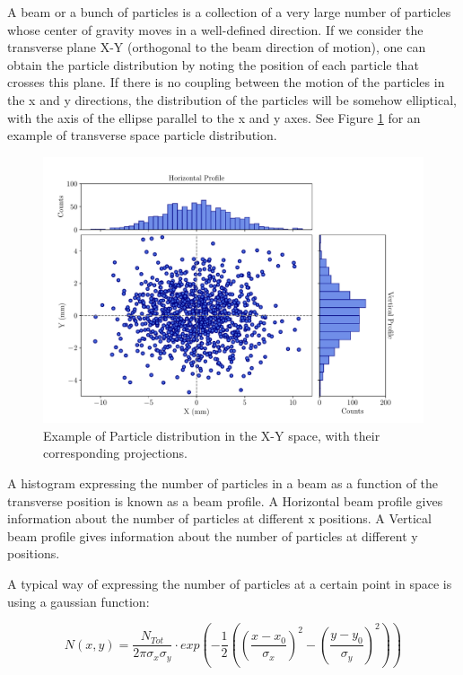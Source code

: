 A beam or a bunch of particles is a collection of a very large number of particles whose center of gravity moves in a well-defined direction. If we consider the transverse plane X-Y (orthogonal to the beam direction of motion), one can obtain the particle distribution by noting the position of each particle that crosses this plane. If there is no coupling between the motion of the particles in the x and y directions, the distribution of the particles will be somehow elliptical, with the axis of the ellipse parallel to the x and y axes. See Figure \ref{fig:TransversePlane} for an example of transverse space particle distribution. 

\begin{figure}[h]
    \centering
    \includegraphics[width=0.9\columnwidth]{Figure_ParticlePositionExample/ParticlePosition.pdf}
    \caption{Example of Particle distribution in the X-Y space, with their corresponding projections.}
    \label{fig:TransversePlane}
\end{figure}

A histogram expressing the number of particles in a beam as a function of the transverse position is known as a beam profile. A Horizontal beam profile gives information about the number of particles at different x positions. A Vertical beam profile gives information about the number of particles at different y positions. 

A typical way of expressing the number of particles at a certain point in space is using a gaussian function:

\begin{equation}
    N(x,y) = \frac{N_{Tot}}{2\pi\sigma_x \sigma_y}\cdot exp\left(-\frac{1}{2}\left(\left(\frac{x-x_0}{\sigma_x}\right)^2 -\left(\frac{y-y_0}{\sigma_y}\right)^2\right)\right)
    \label{eq:GaussianDist}
\end{equation}

